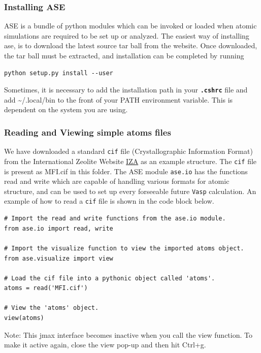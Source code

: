 \documentclass[11pt]{article}
\begin{document}
\subsubsection{Installing ASE}
\label{sec:org1364f4c}
ASE is a bundle of python modules which can be invoked or loaded when atomic simulations are required to be set up or analyzed. The easiest way of installing ase, is to download the latest source tar ball from the website. Once downloaded, the tar ball must be extracted, and installation can be completed by running 

\begin{verbatim}
python setup.py install --user
\end{verbatim}

Sometimes, it is necessary to add the installation path in your \textbf{\texttt{.cshrc}} file and add \textasciitilde{}/.local/bin to the front of your PATH environment variable. This is dependent on the system you are using. 

\subsubsection{Reading and Viewing simple atoms files}
\label{sec:org14d42e2}
We have downloaded a standard \texttt{cif} file (Crystallographic Information Format) from the International Zeolite Website \href{http://www.iza-online.org/}{IZA} as an example structure. The \texttt{cif} file is present as MFI.cif in this folder. 
The ASE module \texttt{ase.io} has the functions read and write which are capable of handling various formats for atomic structure, and can be used to set up every forseeable future \texttt{Vasp} calculation. An example of how to read a \texttt{cif} file is shown in the code block below.

\begin{verbatim}
# Import the read and write functions from the ase.io module.
from ase.io import read, write

# Import the visualize function to view the imported atoms object.
from ase.visualize import view

# Load the cif file into a pythonic object called 'atoms'.
atoms = read('MFI.cif')

# View the 'atoms' object.
view(atoms)
\end{verbatim}

Note: This jmax interface becomes inactive when you call the view function. To make it active again, close the view pop-up and then hit Ctrl+g.
\end{document}
